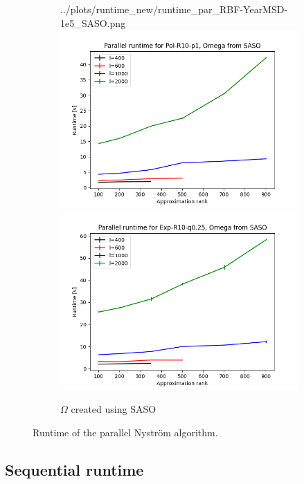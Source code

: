 \documentclass{article}
\theoremstyle{definition}
\begin{document}
\begin{figure}
\begin{subfigure}[t]{0.4\textwidth}
        {../plots/runtime_new/runtime_par_RBF-YearMSD-1e5_SASO.png}
    \includegraphics[width=\textwidth]
        {../plots/runtime_new/runtime_par_Pol-R10-p1_SASO.png}
    \includegraphics[width=\textwidth]
        {../plots/runtime_new/runtime_par_Exp-R10-q0.25_SASO.png}
    \caption{$\Omega$ created using SASO}
\end{subfigure}\hfill
\caption{Runtime of the parallel Nyström algorithm.}
\label{fig:Runtime}
\end{figure}

\subsection{Sequential runtime}
\end{document}
